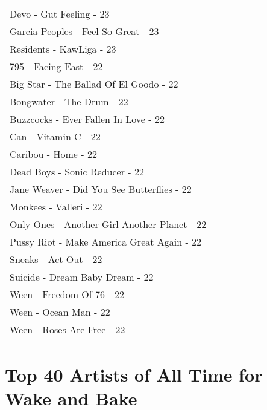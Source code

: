 \documentclass[
]{article}
\begin{document}
\begin{longtable}{l}
Devo - Gut Feeling - 23 \\ 
Garcia Peoples - Feel So Great - 23 \\ 
Residents - KawLiga - 23 \\ 
795 - Facing East - 22 \\ 
Big Star - The Ballad Of El Goodo - 22 \\ 
Bongwater - The Drum - 22 \\ 
Buzzcocks - Ever Fallen In Love - 22 \\ 
Can - Vitamin C - 22 \\ 
Caribou - Home - 22 \\ 
Dead Boys - Sonic Reducer - 22 \\ 
Jane Weaver - Did You See Butterflies - 22 \\ 
Monkees - Valleri - 22 \\ 
Only Ones - Another Girl Another Planet - 22 \\ 
Pussy Riot - Make America Great Again - 22 \\ 
Sneaks - Act Out - 22 \\ 
Suicide - Dream Baby Dream - 22 \\ 
Ween - Freedom Of 76 - 22 \\ 
Ween - Ocean Man - 22 \\ 
Ween - Roses Are Free - 22 \\ 
 \bottomrule
\end{longtable}

\newpage

\hypertarget{top-40-artists-of-all-time-for-wake-and-bake}{%
\section{Top 40 Artists of All Time for Wake and
Bake}\label{top-40-artists-of-all-time-for-wake-and-bake}}
\end{document}

